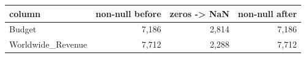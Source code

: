 \begin{tabular}{lrrr}
\toprule
column & non-null before & zeros -> NaN & non-null after \\
\midrule
Budget & 7{,}186 & 2{,}814 & 7{,}186 \\
Worldwide\_Revenue & 7{,}712 & 2{,}288 & 7{,}712 \\
\bottomrule
\end{tabular}
